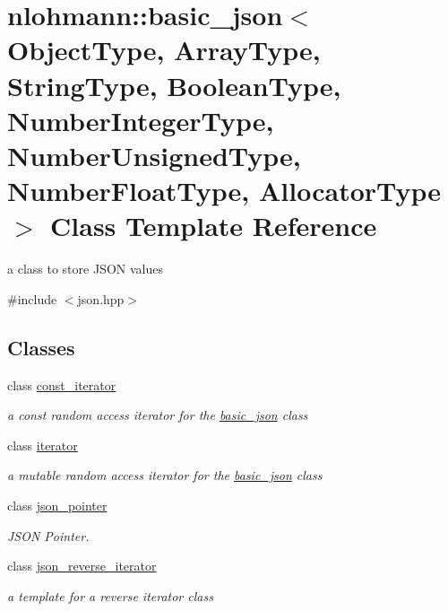 \hypertarget{classnlohmann_1_1basic__json}{\section{nlohmann\-:\-:basic\-\_\-json$<$ Object\-Type, Array\-Type, String\-Type, Boolean\-Type, Number\-Integer\-Type, Number\-Unsigned\-Type, Number\-Float\-Type, Allocator\-Type $>$ Class Template Reference}
\label{classnlohmann_1_1basic__json}
}


a class to store J\-S\-O\-N values  




{\ttfamily \#include $<$json.\-hpp$>$}

\subsection*{Classes}
\begin{DoxyCompactItemize}
\item 
class \hyperlink{classnlohmann_1_1basic__json_1_1const__iterator}{const\-\_\-iterator}
\begin{DoxyCompactList}\small\item\em a const random access iterator for the \hyperlink{classnlohmann_1_1basic__json}{basic\-\_\-json} class \end{DoxyCompactList}\item 
class \hyperlink{classnlohmann_1_1basic__json_1_1iterator}{iterator}
\begin{DoxyCompactList}\small\item\em a mutable random access iterator for the \hyperlink{classnlohmann_1_1basic__json}{basic\-\_\-json} class \end{DoxyCompactList}\item 
class \hyperlink{classnlohmann_1_1basic__json_1_1json__pointer}{json\-\_\-pointer}
\begin{DoxyCompactList}\small\item\em J\-S\-O\-N Pointer. \end{DoxyCompactList}\item 
class \hyperlink{classnlohmann_1_1basic__json_1_1json__reverse__iterator}{json\-\_\-reverse\-\_\-iterator}
\begin{DoxyCompactList}\small\item\em a template for a reverse iterator class \end{DoxyCompactList}\end{DoxyCompactItemize}
